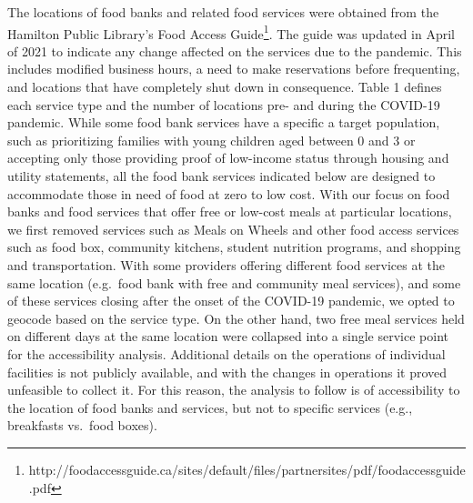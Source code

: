 \documentclass[]{elsarticle} %
\begin{document}
The locations of food banks and related food services were obtained from
the Hamilton Public Library's Food Access Guide\footnote{http://foodaccessguide.ca/sites/default/files/partnersites/pdf/foodaccessguide.pdf}.
The guide was updated in April of 2021 to indicate any change affected
on the services due to the pandemic. This includes modified business
hours, a need to make reservations before frequenting, and locations
that have completely shut down in consequence. Table 1 defines each
service type and the number of locations pre- and during the COVID-19
pandemic. While some food bank services have a specific a target
population, such as prioritizing families with young children aged
between 0 and 3 or accepting only those providing proof of low-income
status through housing and utility statements, all the food bank
services indicated below are designed to accommodate those in need of
food at zero to low cost. With our focus on food banks and food services
that offer free or low-cost meals at particular locations, we first
removed services such as Meals on Wheels and other food access services
such as food box, community kitchens, student nutrition programs, and
shopping and transportation. With some providers offering different food
services at the same location (e.g.~food bank with free and community
meal services), and some of these services closing after the onset of
the COVID-19 pandemic, we opted to geocode based on the service type. On
the other hand, two free meal services held on different days at the
same location were collapsed into a single service point for the
accessibility analysis. Additional details on the operations of
individual facilities is not publicly available, and with the changes in
operations it proved unfeasible to collect it. For this reason, the
analysis to follow is of accessibility to the location of food banks and
services, but not to specific services (e.g., breakfasts vs.~food
boxes).
\end{document}
